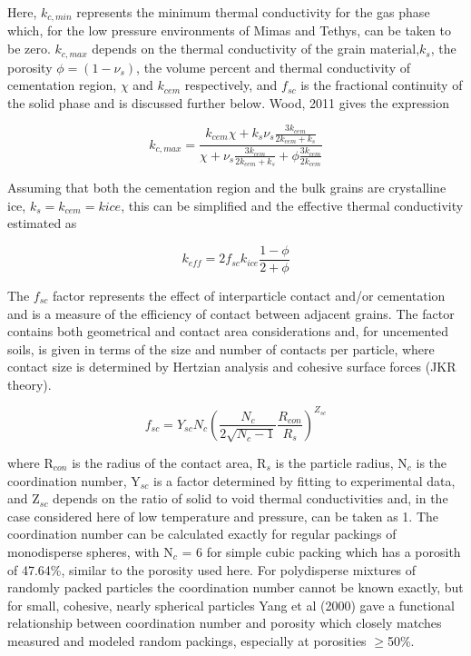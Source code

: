 \documentclass[11pt]{article} %
\begin{document}
\begin{itemize}
	Here, $k_{c,min}$ represents the minimum thermal conductivity for the gas phase which, for the low pressure environments of Mimas and Tethys, can be taken to be zero. $k_{c,max}$ depends on the thermal conductivity of the grain material,$ k_{s}$, the porosity $\phi = (1-\nu_{s})$, the volume percent and thermal conductivity of cementation region, $\chi$ and $k_{cem}$ respectively, and  $f_{sc}$ is the fractional continuity of the solid phase and is discussed further below. Wood, 2011 gives the expression
	
	\begin{equation}
	k_{c,max} = \frac{k_{cem}\chi + k_{s}\nu_{s}\frac{3k_{cem}}{2k_{cem}+k_{s}}}{\chi +\nu_{s}\frac{3k_{cem}}{2k_{cem}+k_{s}}+\phi\frac{3k_{cem}}{2k_{cem}}}
	\end{equation}

	Assuming that both the cementation region and the bulk grains are crystalline ice, $k_{s} = k_{cem} = k{ice}$, this can be simplified and the effective thermal conductivity estimated as
	
	\begin{equation}
	k_{eff}=2 f_{sc} k_{ice} \frac{1-\phi}{2+\phi}
	\end{equation}
	
	The $f_{sc}$ factor represents the effect of interparticle contact and/or cementation and is a measure of the efficiency of contact between adjacent grains. The factor contains both geometrical and contact area considerations and, for uncemented soils, is given in terms of the size and number of contacts per particle, where contact size is determined by Hertzian analysis and cohesive surface forces (JKR theory).
	
	\begin{equation}
	f_{sc} = Y_{sc}N_{c} \left( \frac{N_{c}}{2\sqrt{N_{c}-1}} \frac{R_{con}}{R_{s}} \right)^{Z_{sc}}
	\end{equation}
	
	where R$_{con}$ is the radius of the contact area, R$_{s}$ is the particle radius, N$_{c}$ is the coordination number, Y$_{sc}$ is a factor determined by fitting to experimental data, and Z$_{sc}$ depends on the ratio of solid to void thermal conductivities and, in the case considered here of low temperature and pressure, can be taken as 1. The coordination number can be calculated exactly for regular packings of monodisperse spheres, with N$_{c}$ = 6 for simple cubic packing which has a porosith of 47.64\%, similar to the porosity used here. For polydisperse mixtures of randomly packed particles the coordination number cannot be known exactly, but for small, cohesive, nearly spherical particles Yang et al (2000) gave a functional relationship between coordination number and porosity which closely matches measured and modeled random packings, especially at porosities $\ge$50\%. 
	

\end{itemize}
\end{document}

